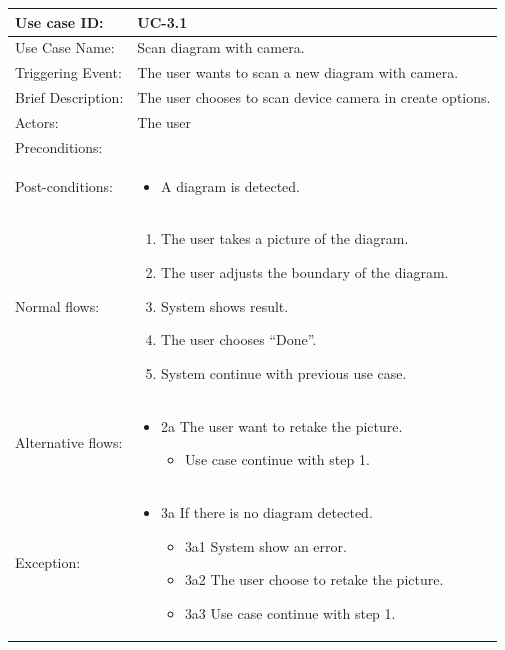 \begin{table}[]
\begin{tabular}{| m{4cm} | m{11cm} |}
\hline
Use case ID:       & UC-3.1 \\ \hline
Use Case Name:     & Scan diagram with camera. \\ \hline
Triggering Event:  & The user wants to scan a new diagram with camera. \\ \hline
Brief Description: & The user chooses to scan device camera in create options. \\ \hline
Actors:            & The user \\ \hline
Preconditions:     & \\ \hline
Post-conditions:   & \begin{itemize}
    \item A diagram is detected.
\end{itemize} \\ \hline
Normal flows:      & \begin{enumerate}
    \item The user takes a picture of the diagram.
    \item The user adjusts the boundary of the diagram.
    \item System shows result.
    \item The user chooses “Done”. 
    \item System continue with previous use case.
\end{enumerate} \\ \hline
Alternative flows: & \begin{itemize}
    \item {2a The user want to retake the picture.}
    \begin{itemize}
        \item Use case continue with step 1.
    \end{itemize}
\end{itemize} \\ \hline
Exception: & \begin{itemize}
    \item {3a If there is no diagram detected.}
    \begin{itemize}
        \item 3a1 System show an error.
        \item 3a2 The user choose to retake the picture.
        \item 3a3 Use case continue with step 1.
    \end{itemize}
\end{itemize} \\ \hline
\end{tabular}
\end{table}

